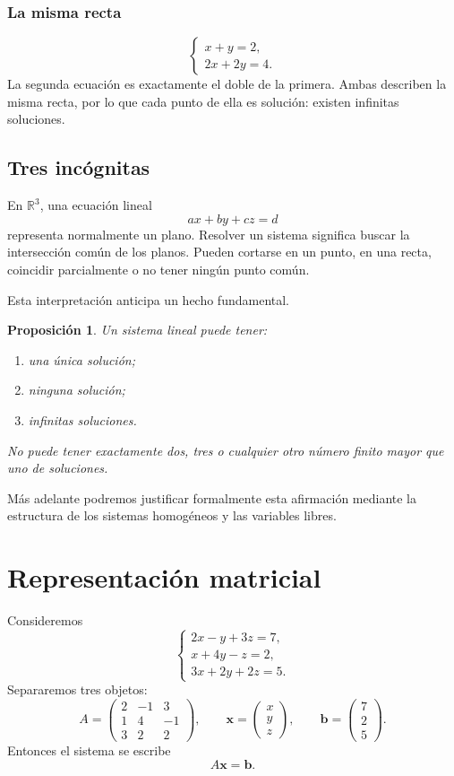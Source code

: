 \documentclass[12pt]{article}
\newtheorem{proposicion}[definicion]{Proposición}
\theoremstyle{remark}
\newcommand{\R}{\mathbb{R}}
\begin{document}
\subsubsection*{La misma recta}
\[
\begin{cases}
x+y=2,\\
2x+2y=4.
\end{cases}
\]
La segunda ecuación es exactamente el doble de la primera. Ambas describen la misma recta, por lo que
cada punto de ella es solución: existen infinitas soluciones.

\subsection{Tres incógnitas}

En $\R^3$, una ecuación lineal
\[
ax+by+cz=d
\]
representa normalmente un plano. Resolver un sistema significa buscar la intersección común de los
planos. Pueden cortarse en un punto, en una recta, coincidir parcialmente o no tener ningún punto común.

Esta interpretación anticipa un hecho fundamental.

\begin{proposicion}
Un sistema lineal puede tener:
\begin{enumerate}
\item una única solución;
\item ninguna solución;
\item infinitas soluciones.
\end{enumerate}
No puede tener exactamente dos, tres o cualquier otro número finito mayor que uno de soluciones.
\end{proposicion}

Más adelante podremos justificar formalmente esta afirmación mediante la estructura de los sistemas
homogéneos y las variables libres.

\section{Representación matricial}

Consideremos
\[
\begin{cases}
2x-y+3z=7,\\
x+4y-z=2,\\
3x+2y+2z=5.
\end{cases}
\]
Separaremos tres objetos:
\[
A=
\begin{pmatrix}
2&-1&3\\
1&4&-1\\
3&2&2
\end{pmatrix},
\qquad
\mathbf{x}=
\begin{pmatrix}x\\y\\z\end{pmatrix},
\qquad
\mathbf{b}=
\begin{pmatrix}7\\2\\5\end{pmatrix}.
\]
Entonces el sistema se escribe
\[
A\mathbf{x}=\mathbf{b}.
\]
\end{document}
